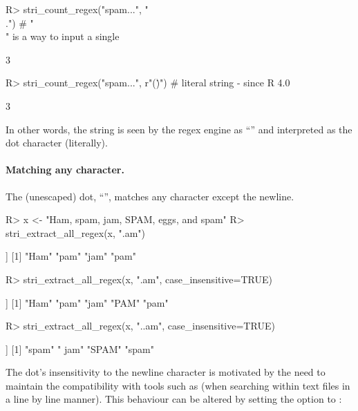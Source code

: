 \documentclass[nojss]{jss}
\begin{document}
\begin{Schunk}
\begin{Sinput}
R> stri_count_regex("spam...", "\\.")   # "\\" is a way to input a single \
\end{Sinput}
\begin{Soutput}
[1] 3
\end{Soutput}
\begin{Sinput}
R> stri_count_regex("spam...", r"(\.)") # literal string - since R 4.0
\end{Sinput}
\begin{Soutput}
[1] 3
\end{Soutput}
\end{Schunk}

In other words, the  string 
is seen by the regex engine as ``\code{\textbackslash.}'' and interpreted
as the dot character (literally).


\paragraph{Matching any character.}
The (unescaped) dot, ``'', matches any character except the newline.

\begin{Schunk}
\begin{Sinput}
R> x <- "Ham, spam, jam, SPAM, eggs, and spam"
R> stri_extract_all_regex(x, ".am")
\end{Sinput}
\begin{Soutput}
[[1]]
[1] "Ham" "pam" "jam" "pam"
\end{Soutput}
\begin{Sinput}
R> stri_extract_all_regex(x, ".am", case_insensitive=TRUE)
\end{Sinput}
\begin{Soutput}
[[1]]
[1] "Ham" "pam" "jam" "PAM" "pam"
\end{Soutput}
\begin{Sinput}
R> stri_extract_all_regex(x, "..am", case_insensitive=TRUE)
\end{Sinput}
\begin{Soutput}
[[1]]
[1] "spam" " jam" "SPAM" "spam"
\end{Soutput}
\end{Schunk}




The dot's insensitivity to the newline character is motivated
by the need to maintain the compatibility with tools such as 
(when searching within text files in a line by line manner).
This behaviour can be altered by setting the  option to :
\end{document}
